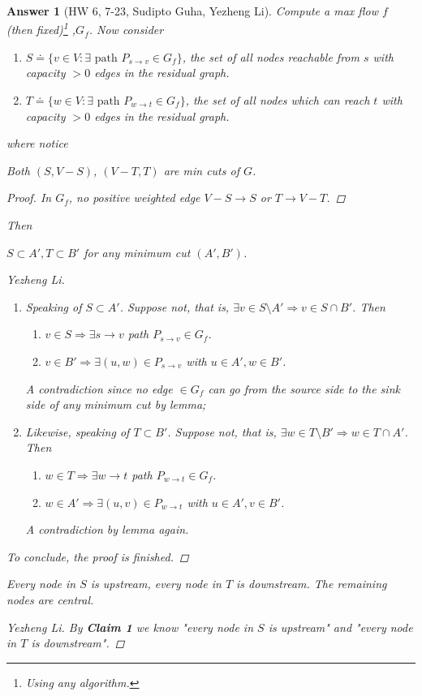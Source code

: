 \documentclass[11pt]{article}
\theoremstyle{numberplain}
\theoremstyle{nonumberplain}
\newtheorem{proof}{Proof}
\newtheorem{ans}{Answer}
\newcommand{\0}{{\mathbf{0}}}
\begin{document}
\begin{ans}[HW 6, 7-23, Sudipto Guha, Yezheng Li]
Compute a max flow $f$ (then fixed)\footnote{Using any algorithm.}
,$G_f$. Now consider 
\begin{enumerate}
\item $S\doteq\{v\in V:\exists \text{ path }P_{s\rightarrow v}\in G_f\}$, the set of all nodes reachable from $s$ with capacity $>0$ edges in the residual graph. 
\item $T\doteq\{w\in V:\exists \text{ path }P_{w\rightarrow t}\in G_f\}$, the set of all nodes which can reach $t$ with capacity $>0$ edges in the residual graph. 
\end{enumerate}
where notice
\begin{claim} Both $(S,V-S)$, $(V-T,T)$ are min cuts of $G$.
\end{claim}
\begin{proof}
In $G_f$, no positive weighted edge $V-S\to S$ or $T\to V-T$.
\end{proof}
Then
\begin{claim}[Yezheng Li]$S\subset A',T\subset B'$ for any minimum cut $(A',B')$.
\end{claim}
\begin{proof}[Yezheng Li]
\begin{enumerate}
\item Speaking of $S\subset A'$. Suppose not, that is, $\exists v\in S\setminus A'\Rightarrow v\in S\cap B'$. Then
\begin{enumerate}
\item $v \in S\Rightarrow \exists s\rightarrow v$ path $P_{s\rightarrow v}\in G_f$.

\item $v \in B'\Rightarrow \exists (u,w)\in P_{s\rightarrow v}$ with $u \in A', w \in B'$.
\end{enumerate}
 A contradiction since no edge $\in G_{f}$ can go from the source side to the sink side of any minimum cut by lemma;
\item Likewise, speaking of $T\subset B'$. Suppose not, that is, $\exists w\in T\setminus B'\Rightarrow w\in T\cap A'$. Then
\begin{enumerate}
\item $w \in T\Rightarrow \exists w\rightarrow t$ path $P_{w\rightarrow t}\in G_f$.

\item $w \in A'\Rightarrow \exists (u,v)\in P_{w\rightarrow t}$ with $u \in A', v \in B'$.
\end{enumerate}
 A contradiction by lemma again.
\end{enumerate}
To conclude, the proof is finished.
\end{proof}
\begin{claim}
Every node in $S$ is upstream, every node in $T$ is downstream. The remaining nodes are central.
\end{claim}
\begin{proof}[Yezheng Li] 
By \textbf{Claim 1} we know "every node in $S$ is upstream" and "every node in $T$ is downstream".


\end{proof}
\end{ans}
\end{document}
